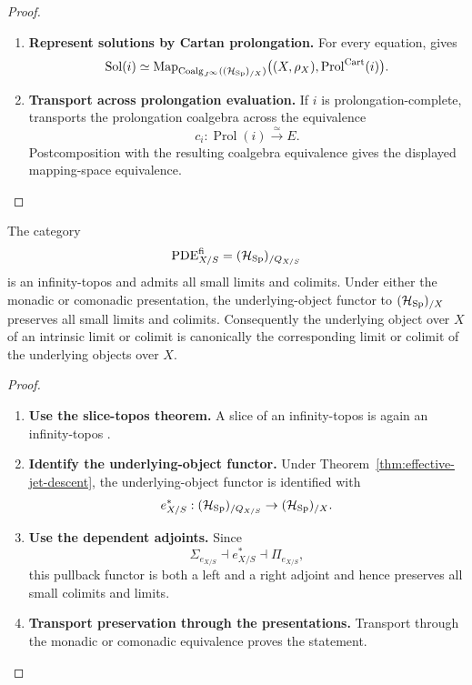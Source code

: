 \begin{proof}
\leavevmode
\begin{enumerate}[label=\textup{(\arabic*)}]
    \item \textbf{Represent solutions by Cartan prolongation.}
For every equation,  gives
\[
  \operatorname{Sol}(i)
  \simeq
  \operatorname{Map}_{\operatorname{Coalg}_{J^\infty}((\mathcal H_{\operatorname{Sp}})_{/X})}
  \bigl((X,\rho_X),\operatorname{Prol}^{\mathrm{Cart}}(i)\bigr).
\]

    \item \textbf{Transport across prolongation evaluation.}
If \(i\) is prolongation-complete,
 transports the prolongation
coalgebra across the equivalence
\[
  c_i:\operatorname{Prol}(i)\xrightarrow{\simeq}E.
\]
Postcomposition with the resulting coalgebra equivalence gives the displayed
mapping-space equivalence.
\end{enumerate}
\end{proof}

\begin{theorem}
\label{thm:PDE-topos-limits}
The category
\[
  \operatorname{PDE}^{\mathrm{fi}}_{X/S}
  =
  (\mathcal H_{\operatorname{Sp}})_{/Q_{X/S}}
\]
is an infinity-topos and admits all small limits and colimits. Under either
the monadic or comonadic presentation, the underlying-object functor to
\((\mathcal H_{\operatorname{Sp}})_{/X}\) preserves all small limits and colimits. Consequently the
underlying object over \(X\) of an intrinsic limit or colimit is canonically the
corresponding limit or colimit of the underlying objects over \(X\).
\end{theorem}

\begin{proof}
\leavevmode
\begin{enumerate}[label=\textup{(\arabic*)}]
    \item \textbf{Use the slice-topos theorem.}
A slice of an infinity-topos is again an infinity-topos
\cite{LurieHTT}.

    \item \textbf{Identify the underlying-object functor.}
Under
Theorem~\ref{thm:effective-jet-descent}, the underlying-object functor is
identified with
\[
  e_{X/S}^*:(\mathcal H_{\operatorname{Sp}})_{/Q_{X/S}}\to(\mathcal H_{\operatorname{Sp}})_{/X}.
\]

    \item \textbf{Use the dependent adjoints.}
Since
\[
  \Sigma_{e_{X/S}}\dashv e_{X/S}^*\dashv\Pi_{e_{X/S}},
\]
this pullback functor is both a left and a right adjoint and hence preserves all
small colimits and limits.

    \item \textbf{Transport preservation through the presentations.}
Transport through the monadic or comonadic equivalence proves the statement.
\end{enumerate}
\end{proof}

